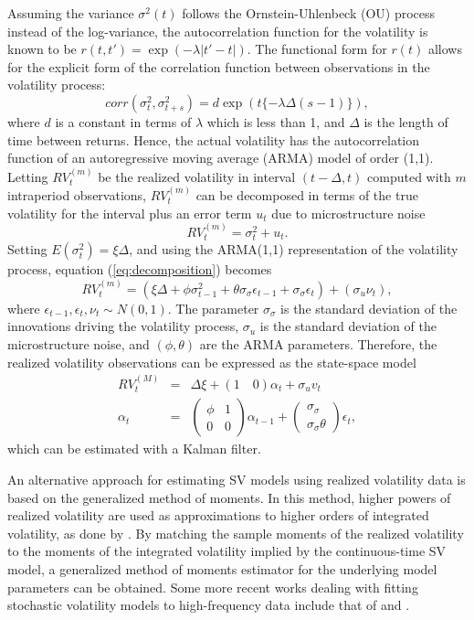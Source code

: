 Assuming the variance $\sigma^2(t)$ follows the Ornstein-Uhlenbeck (OU) process instead of the log-variance, the autocorrelation function for the volatility is known to be $r(t, t') = \exp(-\lambda \left| t' - t \right|)$. The functional form for $r(t)$ allows for the explicit form of the correlation function between observations in the volatility process:
%
\[ corr(\sigma^2_{t}, \sigma^2_{t+s}) = d \exp(t\{ -\lambda\Delta(s-1) \}), \]
%
where $d$ is a constant in terms of $\lambda$ which is less than 1, and $\Delta$ is the length of time between returns. Hence, the actual volatility has the autocorrelation function of an autoregressive moving average (ARMA) model of order (1,1). Letting $RV^{(m)}_t$ be the realized volatility in interval $(t-\Delta, t)$ computed with $m$ intraperiod observations, $RV^{(m)}_t$ can be decomposed in terms of the true volatility for the interval plus an error term $u_t$ due to microstructure noise
\begin{equation}
	RV^{(m)}_t = \sigma^2_t + u_t. \label{eq:decomposition}
\end{equation}
Setting $E(\sigma^2_t) = \xi \Delta$, and using the ARMA(1,1) representation of the volatility process, equation (\ref{eq:decomposition}) becomes
\[
	RV^{(m)}_t = (\xi \Delta + \phi \sigma^2_{t-1} + \theta \sigma_{\sigma}\epsilon_{t-1} + \sigma_{\sigma}\epsilon_{t} ) + (\sigma_u \nu_t),
 \]
where $\epsilon_{t-1}, \epsilon_t, \nu_t \sim N(0,1)$. The parameter $\sigma_{\sigma}$ is the standard deviation of the innovations driving the volatility process, $\sigma_u$ is the standard deviation of the microstructure noise, and $(\phi,\theta)$ are the ARMA parameters. Therefore, the realized volatility observations can be expressed as the state-space model
\begin{eqnarray*}
	RV^{(M)}_t &=& \Delta \xi + (1 \quad 0 )\alpha_t + \sigma_u v_{t} \\
	\alpha_{t} &=& \left( \begin{array}{cc} \phi & 1 \\ 0 & 0 \end{array} \right) \alpha_{t-1} + \left( \begin{array}{c} \sigma_\sigma \\ \sigma_\sigma \theta \end{array} \right) \epsilon_{t},
\end{eqnarray*}
which can be estimated with a Kalman filter.

An alternative approach for estimating SV models using realized volatility data is based on the generalized method of moments. In this method, higher powers of realized volatility are used as approximations to higher orders of integrated volatility, as done by \cite{bollerslev2002estimating}. By matching the sample moments of the realized volatility to the moments of the integrated volatility implied by the continuous-time SV model, a generalized method of moments estimator for the underlying model parameters can be obtained. Some more recent works dealing with fitting stochastic volatility models to high-frequency data include that of \cite{venter2012extended} and \cite{shirota2014realized}.

